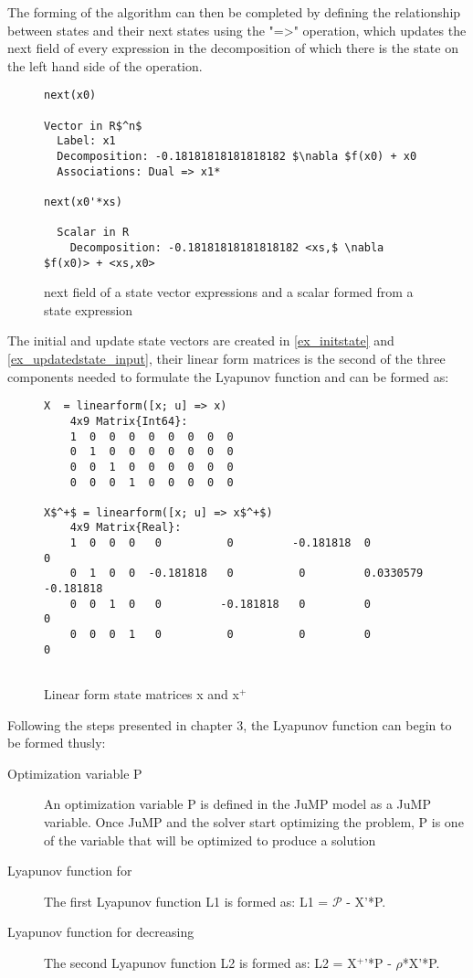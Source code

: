 The forming of the algorithm can then be completed by defining the relationship between states and their next states using the "=>" operation, which updates the next field of every expression in the decomposition of which there is the state on the left hand side of the operation.

\begin{figure}[h!]
	\begin{lstlisting}[mathescape]
next(x0)

Vector in R$^n$
  Label: x1
  Decomposition: -0.18181818181818182 $\nabla $f(x0) + x0
  Associations: Dual => x1*

next(x0'*xs)

  Scalar in R
    Decomposition: -0.18181818181818182 <xs,$ \nabla $f(x0)> + <xs,x0>
\end{lstlisting}
\caption{next field of a state vector expressions and a scalar formed from a state expression}
\label{ex_next}
\end{figure}

The initial and update state vectors are created in \ref{ex_initstate} and \ref{ex_updatedstate_input}, their linear form matrices is the second of the three components needed to formulate the Lyapunov function and can be formed as:

\begin{figure}[h!]
    \begin{lstlisting}[mathescape]
X  = linearform([x; u] => x)
    4x9 Matrix{Int64}:
    1  0  0  0  0  0  0  0  0
    0  1  0  0  0  0  0  0  0
    0  0  1  0  0  0  0  0  0
    0  0  0  1  0  0  0  0  0

X$^+$ = linearform([x; u] => x$^+$)
    4x9 Matrix{Real}:
    1  0  0  0   0          0         -0.181818  0           0
    0  1  0  0  -0.181818   0          0         0.0330579  -0.181818
    0  0  1  0   0         -0.181818   0         0           0
    0  0  0  1   0          0          0         0           0
    
    \end{lstlisting}
    \caption{Linear form state matrices x and x$^+$}
    \label{ex_linearform_state}
    \end{figure}

Following the steps presented in chapter 3, the Lyapunov function can begin to be formed thusly:
\begin{description}
    \item [Optimization variable P] An optimization variable P is defined in the JuMP model as a JuMP variable. Once JuMP and the solver start optimizing the problem, P is one of the variable that will be optimized to produce a solution
    \item [Lyapunov function for ] The first Lyapunov function L1 is formed as: L1 = $\mathcal{P} $ - X'*P.
    \item [Lyapunov function for decreasing] The second Lyapunov function L2 is formed as: L2 = X$^+ $'*P - $\rho $*X'*P.    
\end{description}

